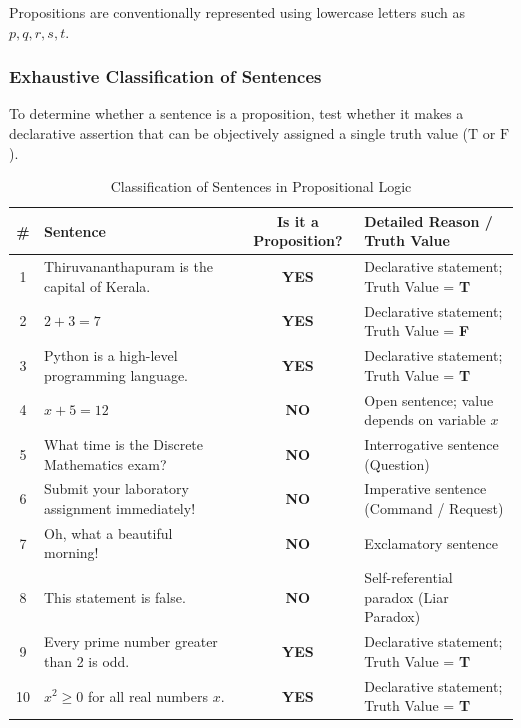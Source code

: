 \documentclass[11pt,a4paper]{article}
\begin{document}
Propositions are conventionally represented using lowercase letters such as $p, q, r, s, t$.

\subsubsection*{Exhaustive Classification of Sentences}

To determine whether a sentence is a proposition, test whether it makes a declarative assertion that can be objectively assigned a single truth value ($\text{T}$ or $\text{F}$).

\begin{table}[htbp]
\centering
\small
\begin{tabularx}{\textwidth}{|c|X|c|X|}
\hline
\rowcolor{primaryblue} \color{white}\textbf{\#} & \color{white}\textbf{Sentence} & \color{white}\textbf{Is it a Proposition?} & \color{white}\textbf{Detailed Reason / Truth Value} \\ \hline
1 & Thiruvananthapuram is the capital of Kerala. & \textbf{YES} & Declarative statement; Truth Value = \textbf{T} \\ \hline
2 & $2 + 3 = 7$ & \textbf{YES} & Declarative statement; Truth Value = \textbf{F} \\ \hline
3 & Python is a high-level programming language. & \textbf{YES} & Declarative statement; Truth Value = \textbf{T} \\ \hline
4 & $x + 5 = 12$ & \textbf{NO} & Open sentence; value depends on variable $x$ \\ \hline
5 & What time is the Discrete Mathematics exam? & \textbf{NO} & Interrogative sentence (Question) \\ \hline
6 & Submit your laboratory assignment immediately! & \textbf{NO} & Imperative sentence (Command / Request) \\ \hline
7 & Oh, what a beautiful morning! & \textbf{NO} & Exclamatory sentence \\ \hline
8 & This statement is false. & \textbf{NO} & Self-referential paradox (Liar Paradox) \\ \hline
9 & Every prime number greater than 2 is odd. & \textbf{YES} & Declarative statement; Truth Value = \textbf{T} \\ \hline
10 & $x^2 \ge 0$ for all real numbers $x$. & \textbf{YES} & Declarative statement; Truth Value = \textbf{T} \\ \hline
\end{tabularx}
\caption{Classification of Sentences in Propositional Logic}
\end{table}
\end{document}
